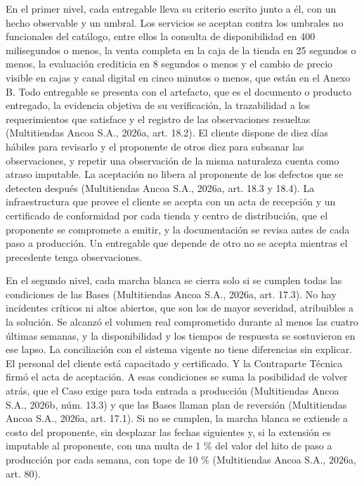 \documentclass[11pt]{article}
\begin{document}
En el primer nivel, cada entregable lleva su criterio escrito junto a él, con un hecho observable y un umbral. Los servicios se aceptan contra los umbrales no funcionales del catálogo, entre ellos la consulta de disponibilidad en 400 milisegundos o menos, la venta completa en la caja de la tienda en 25 segundos o menos, la evaluación crediticia en 8 segundos o menos y el cambio de precio visible en cajas y canal digital en cinco minutos o menos, que están en el Anexo B. Todo entregable se presenta con el artefacto, que es el documento o producto entregado, la evidencia objetiva de su verificación, la trazabilidad a los requerimientos que satisface y el registro de las observaciones resueltas (Multitiendas Ancoa S.A., 2026a, art. 18.2). El cliente dispone de diez días hábiles para revisarlo y el proponente de otros diez para subsanar las observaciones, y repetir una observación de la misma naturaleza cuenta como atraso imputable. La aceptación no libera al proponente de los defectos que se detecten después (Multitiendas Ancoa S.A., 2026a, art. 18.3 y 18.4). La infraestructura que provee el cliente se acepta con un acta de recepción y un certificado de conformidad por cada tienda y centro de distribución, que el proponente se compromete a emitir, y la documentación se revisa antes de cada paso a producción. Un entregable que depende de otro no se acepta mientras el precedente tenga observaciones.

En el segundo nivel, cada marcha blanca se cierra solo si se cumplen todas las condiciones de las Bases (Multitiendas Ancoa S.A., 2026a, art. 17.3). No hay incidentes críticos ni altos abiertos, que son los de mayor severidad, atribuibles a la solución. Se alcanzó el volumen real comprometido durante al menos las cuatro últimas semanas, y la disponibilidad y los tiempos de respuesta se sostuvieron en ese lapso. La conciliación con el sistema vigente no tiene diferencias sin explicar. El personal del cliente está capacitado y certificado. Y la Contraparte Técnica firmó el acta de aceptación. A esas condiciones se suma la posibilidad de volver atrás, que el Caso exige para toda entrada a producción (Multitiendas Ancoa S.A., 2026b, núm. 13.3) y que las Bases llaman plan de reversión (Multitiendas Ancoa S.A., 2026a, art. 17.1). Si no se cumplen, la marcha blanca se extiende a costo del proponente, sin desplazar las fechas siguientes y, si la extensión es imputable al proponente, con una multa de 1 \% del valor del hito de paso a producción por cada semana, con tope de 10 \% (Multitiendas Ancoa S.A., 2026a, art. 80).
\end{document}
